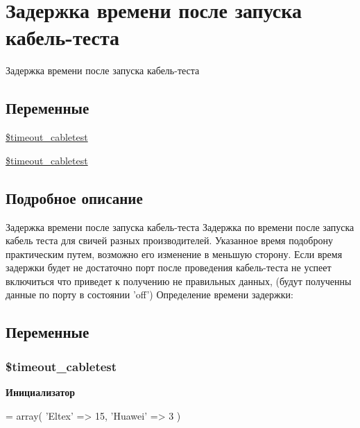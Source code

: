 \hypertarget{group__timeout__cabletest}{\section{Задержка времени после запуска кабель-\/теста}
\label{group__timeout__cabletest}
}


Задержка времени после запуска кабель-\/теста  


\subsection*{Переменные}
\begin{DoxyCompactItemize}
\item 
\hyperlink{group__timeout__cabletest_ga4bf51deec9851d3432a7b41ccb07f2c8}{\$timeout\-\_\-cabletest}
\item 
\hyperlink{group__timeout__cabletest_ga4bf51deec9851d3432a7b41ccb07f2c8}{\$timeout\-\_\-cabletest}
\end{DoxyCompactItemize}


\subsection{Подробное описание}
Задержка времени после запуска кабель-\/теста Задержка по времени после запуска кабель теста для свичей разных производителей. Указанное время подоброну практическим путем, возможно его изменение в меньшую сторону. Если время задержки будет не достаточно порт после проведения кабель-\/теста не успеет включиться что приведет к получению не правильных данных, (будут полученны данные по порту в состоянии 'off') Определение времени задержки\-: 
 

\subsection{Переменные}
\hypertarget{group__timeout__cabletest_ga4bf51deec9851d3432a7b41ccb07f2c8}{
\subsubsection[{\$timeout\-\_\-cabletest}]{\setlength{\rightskip}{0pt plus 5cm}\$timeout\-\_\-cabletest}}\label{group__timeout__cabletest_ga4bf51deec9851d3432a7b41ccb07f2c8}
{\bfseries Инициализатор}
\begin{DoxyCode}
= array(
    \textcolor{stringliteral}{'Eltex'} => 15,
    \textcolor{stringliteral}{'Huawei'} => 3
)
\end{DoxyCode}


